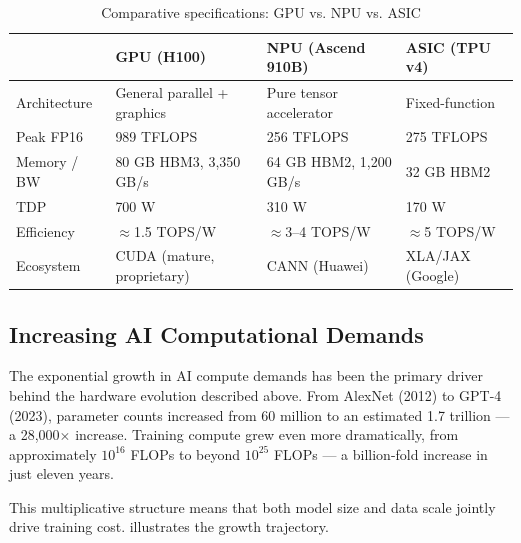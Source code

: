 \begin{table}[htbp]
  \centering
  \caption{Comparative specifications: GPU vs. NPU vs. ASIC}
  \label{tab:accelerator-comparison}
  \begin{tabularx}{\textwidth}{lXXX}
    \toprule
    \tableheader{Attribute & GPU (H100) & NPU (Ascend 910B) & ASIC (TPU v4)} \\
    \midrule
    Architecture   & General parallel + graphics & Pure tensor accelerator & Fixed-function \\
    \rowcolor{TableRowOdd}
    Peak FP16      & 989 TFLOPS                 & 256 TFLOPS             & 275 TFLOPS \\
    Memory / BW    & 80 GB HBM3, 3,350 GB/s    & 64 GB HBM2, 1,200 GB/s & 32 GB HBM2 \\
    \rowcolor{TableRowOdd}
    TDP            & 700 W                      & 310 W                  & 170 W \\
    Efficiency     & $\approx$1.5 TOPS/W        & $\approx$3–4 TOPS/W    & $\approx$5 TOPS/W \\
    \rowcolor{TableRowOdd}
    Ecosystem      & CUDA (mature, proprietary) & CANN (Huawei)          & XLA/JAX (Google) \\
    \bottomrule
  \end{tabularx}
\end{table}

\subsection{Increasing AI Computational Demands}
\label{subsec:compute-demands}

The exponential growth in AI compute demands has been the primary driver
behind the hardware evolution described above. From AlexNet (2012) to GPT-4
(2023), parameter counts increased from 60 million to an estimated 1.7
trillion — a 28,000$\times$ increase. Training compute grew even more
dramatically, from approximately $10^{16}$ FLOPs to beyond $10^{25}$ FLOPs —
a billion-fold increase in just eleven years.

This multiplicative structure means that both model size and data scale
jointly drive training cost.  illustrates the growth trajectory.

